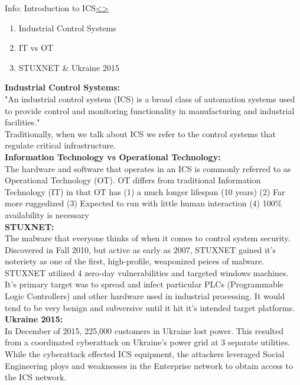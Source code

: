\documentclass[12pt]{extarticle}
\newenvironment{instructionblock}{\Large\bgroup}{\egroup}
\newcommand{\ben}{\begin{enumerate}}
\newcommand{\een}{\end{enumerate}}
\newcounter{next}
\newcounter{prev}
\begin{document}
\pagebreak
{}
\begin{slide}{Info: Introduction to ICS}{\hyperref[slide \theprev]{\textless}\hyperref[slide \thenext]{\textgreater}}
	\begin{instructionblock}
		\ben
			\item Industrial Control Systems
			\item IT vs OT
			\item STUXNET \& Ukraine 2015
		\een
	\end{instructionblock}
\end{slide}
\vfill
\noindent
\textbf{Industrial Control Systems:}\\
"An industrial control system (ICS) is a broad class of automation systems used to provide control and monitoring functionality in manufacturing and industrial facilities." \cite[p.13]{KnappLangill}\\
Traditionally, when we talk about ICS we refer to the control systems that regulate critical infrastructure.\\
\textbf{Information Technology vs Operational Technology:}\\
The hardware and software that operates in an ICS is commonly referred to as Operational Technology (OT). OT differs from traditional Information Technology (IT) in that OT has (1) a much longer lifespan (10 years) (2) Far more ruggedized (3) Expected to run with little human interaction (4) 100\% availability is necessary \cite{NexDef}\\
\textbf{STUXNET:}\\
The malware that everyone thinks of when it comes to control system security. Discovered in Fall 2010, but active as early as 2007, STUXNET gained it's noteriety as one of the first, high-profile, weaponized peices of malware. STUXNET utilized 4 zero-day vulnerabilities and targeted windows machines. It's primary target was to spread and infect particular PLCs (Programmable Logic Controllers) and other hardware used in industrial processing. It would tend to be very benign and subversive until it hit it's intended target platforms. \cite[p.191-192]{KnappLangill}\\
\textbf{Ukraine 2015:}\\
In December of 2015, 225,000 customers in Ukraine lost power. This resulted from a coordinated cyberattack on Ukraine's power grid at 3 separate utilities. While the cyberattack effected ICS equipment, the attackers leveraged Social Engineering ploys and weaknesses in the Enterprise network to obtain access to the ICS network. \cite{Ukraine15}
\pagebreak
\end{document}
